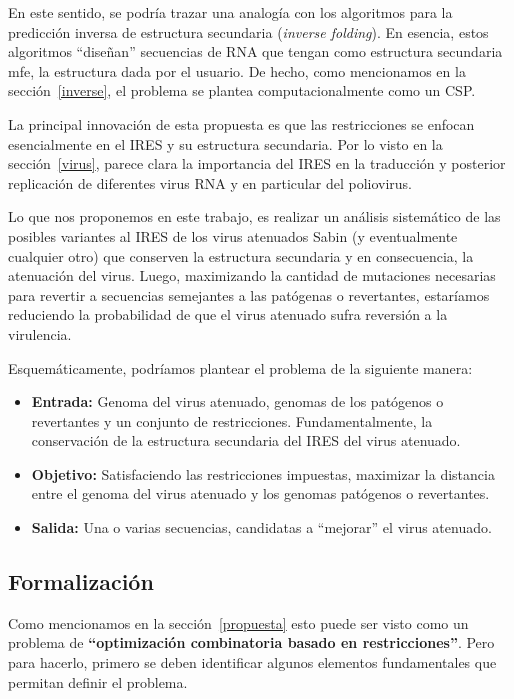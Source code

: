 En este sentido, se podr\'ia trazar una analog\'ia con los algoritmos para la
predicci\'on inversa de estructura secundaria (\textit{inverse folding}). En
esencia, estos algoritmos ``dise\~nan'' secuencias de \ac{RNA} que tengan como
estructura secundaria \ac{mfe}, la estructura dada por el usuario. De hecho,
como mencionamos en la secci\'on~\ref{inverse}, el problema se plantea
computacionalmente como un \ac{CSP}.

La principal innovaci\'on de esta propuesta es que las restricciones se enfocan
esencialmente en el \ac{IRES} y su estructura secundaria. Por lo visto en la
secci\'on~\ref{virus}, parece clara la importancia del \ac{IRES} en la
traducci\'on y posterior replicaci\'on de diferentes virus \ac{RNA} y en
particular del poliovirus.

Lo que nos proponemos en este trabajo, es realizar un an\'alisis sistem\'atico
de las posibles variantes al \ac{IRES} de los virus atenuados  Sabin (y
eventualmente cualquier otro) que conserven la estructura secundaria y
en consecuencia, la atenuaci\'on del virus. Luego, maximizando la cantidad de
mutaciones necesarias para revertir a secuencias semejantes a las pat\'ogenas o
revertantes, estar\'iamos reduciendo la probabilidad de que el virus atenuado
sufra reversi\'on a la virulencia.

Esquem\'aticamente, podr\'iamos plantear el problema de la siguiente manera:
\begin{itemize}
 \item \textbf{Entrada:} Genoma del virus atenuado, genomas de los pat\'ogenos
o revertantes y un conjunto de restricciones. Fundamentalmente, la
conservaci\'on de la estructura secundaria del \ac{IRES} del virus atenuado.
 \item \textbf{Objetivo:} Satisfaciendo las restricciones impuestas, maximizar
la distancia entre el genoma del virus atenuado y los genomas pat\'ogenos o
revertantes.
 \item \textbf{Salida:} Una o varias secuencias, candidatas a ``mejorar'' el
virus atenuado.
\end{itemize}

\subsection{Formalizaci\'on}
\label{formalizacion-prop}
Como mencionamos en la secci\'on~\ref{propuesta} esto puede ser visto como un
problema de \textbf{``optimizaci\'on combinatoria basado en restricciones''}.
Pero para hacerlo, primero se deben identificar algunos elementos fundamentales
que permitan definir el problema.

